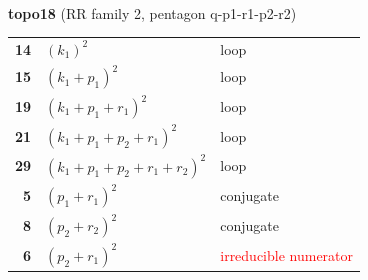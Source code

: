 \documentclass[10pt]{article}
\begin{document}
\begin{minipage}[t]{0.48\textwidth}
{}\\[2mm]\textbf{topo18} (RR family 2, pentagon q-p1-r1-p2-r2)\\[2pt]{\footnotesize\begin{tabular}{@{}r@{\ \ }l@{\ \ }l@{}}\textbf{14} & $(k_1)^2$ & loop\\
\textbf{15} & $(k_1+p_1)^2$ & loop\\
\textbf{19} & $(k_1+p_1+r_1)^2$ & loop\\
\textbf{21} & $(k_1+p_1+p_2+r_1)^2$ & loop\\
\textbf{29} & $(k_1+p_1+p_2+r_1+r_2)^2$ & loop\\
\textbf{5} & $(p_1+r_1)^2$ & conjugate\\
\textbf{8} & $(p_2+r_2)^2$ & conjugate\\
\textbf{6} & $(p_2+r_1)^2$ & \textcolor{red}{irreducible numerator}\\\end{tabular}}\end{minipage}

\bigskip
\end{document}
